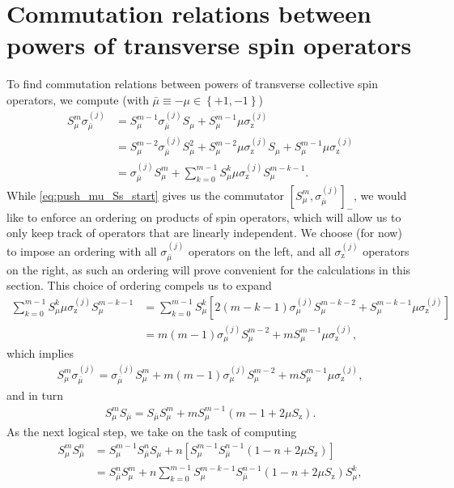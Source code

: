 \documentclass[aps,notitlepage,nofootinbib,11pt]{revtex4-1}
\newcommand{\p}[1]{\left(#1\right)} %
\renewcommand{\sp}[1]{\left[#1\right]} %
\renewcommand{\set}[1]{\left\{#1\right\}} %
\newcommand{\z}{\text{z}}
\newcommand{\bmu}{{\bar\mu}}
\newcommand{\1}{\mathds{1}}
\begin{document}
\section{Commutation relations between powers of transverse spin
  operators}
\label{sec:comm_transverse}

To find commutation relations between powers of transverse collective
spin operators, we compute (with $\bmu\equiv-\mu\in\set{+1,-1}$)
\begin{align}
  S_\mu^m \sigma_\bmu^{(j)}
  &= S_\mu^{m-1}\sigma_\bmu^{(j)} S_\mu
  + S_\mu^{m-1} \mu\sigma_\z^{(j)} \\
  &= S_\mu^{m-2} \sigma_\bmu^{(j)} S_\mu^2
  + S_\mu^{m-2} \mu\sigma_\z^{(j)} S_\mu
  + S_\mu^{m-1} \mu\sigma_\z^{(j)} \\
  &= \sigma_\bmu^{(j)} S_\mu^m
  + \sum_{k=0}^{m-1} S_\mu^k \mu\sigma_\z^{(j)} S_\mu^{m-k-1}
  \label{eq:push_mu_Ss_start}.
\end{align}
While \eqref{eq:push_mu_Ss_start} gives us the commutator
$\sp{S_\mu^m,\sigma_\bmu^{(j)}}_-$, we would like to enforce an
ordering on products of spin operators, which will allow us to only
keep track of operators that are linearly independent.  We choose (for
now) to impose an ordering with all $\sigma_\bmu^{(j)}$ operators on
the left, and all $\sigma_\z^{(j)}$ operators on the right, as such an
ordering will prove convenient for the calculations in this section.
This choice of ordering compels us to expand
\begin{align}
  \sum_{k=0}^{m-1} S_\mu^k \mu\sigma_\z^{(j)} S_\mu^{m-k-1}
  &= \sum_{k=0}^{m-1} S_\mu^k
  \sp{2\p{m-k-1} \sigma_\mu^{(j)} S_\mu^{m-k-2}
    + S_\mu^{m-k-1} \mu\sigma_\z^{(j)}} \\
  &= m \p{m-1} \sigma_\mu^{(j)} S_\mu^{m-2}
  + m S_\mu^{m-1} \mu\sigma_\z^{(j)},
\end{align}
which implies
\begin{align}
  S_\mu^m \sigma_\bmu^{(j)}
  = \sigma_\bmu^{(j)} S_\mu^m + m \p{m-1} \sigma_\mu^{(j)} S_\mu^{m-2}
  + m S_\mu^{m-1} \mu\sigma_\z^{(j)},
  \label{eq:push_mu_Ss}
\end{align}
and in turn
\begin{align}
  S_\mu^m S_\bmu = S_\bmu S_\mu^m
  + m S_\mu^{m-1} \p{m - 1 + 2\mu S_\z}.
  \label{eq:push_mu_single}
\end{align}
As the next logical step, we take on the task of computing
\begin{align}
  S_\mu^m S_\bmu^n
  &= S_\mu^{m-1} S_\bmu^n S_\mu
  + n \sp{S_\mu^{m-1} S_\bmu^{n-1} \p{1 - n + 2\mu S_\z}} \\
  &= S_\bmu^n S_\mu^m
  + n \sum_{k=0}^{m-1} S_\mu^{m-k-1} S_\bmu^{n-1}
  \p{1 - n + 2\mu S_\z} S_\mu^k,
\end{align}
\end{document}
